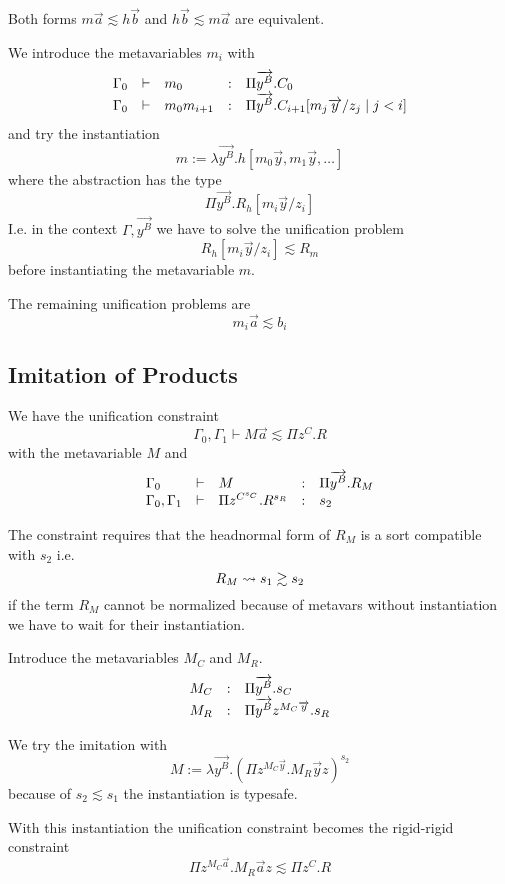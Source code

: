 Both forms $m \vec a \lesssim h \vec b$ and $h \vec b \lesssim m \vec a$ are
equivalent.

We introduce the metavariables $m_i$ with
$$
\begin{array}{lllll} 
    \Gamma_0 &\vdash&
    m_0
    &:&
    \Pi {\overrightarrow {y^B}}. C_0
    \\
    \Gamma_0 &\vdash&
    m_0
    m_{i + 1}
    &:&
    \Pi {\overrightarrow {y^B}}. C_{i + 1}[m_j {\overrightarrow {y}} / z_j \mid j < i]
 \end{array}
$$
and try the instantiation
$$
    m := \lambda \vec{y^B}. h [m_0 \vec y, m_1 \vec y, \ldots]
$$
where the abstraction has the type
$$
    \Pi \vec{y^B}. R_h[m_i \vec y / z_i]
$$
I.e. in the context $\Gamma, \vec{y^B}$ we have to solve the unification problem
$$
    R_h[m_i \vec y / z_i] \lesssim R_m
$$
before instantiating the metavariable $m$.

The remaining unification problems are
$$
    m_i \vec a \lesssim b_i
$$








\subsection{Imitation of Products}

We have the unification constraint
$$
    \Gamma_0, \Gamma_1 \vdash M \vec a \lesssim \Pi z^C. R
$$
with the metavariable $M$ and
$$
\begin{array}{lllll} 
    \Gamma_0
    &\vdash&
    M
    &:&
    \Pi {\overrightarrow {y^B}}. R_M
    \\
    \Gamma_0, \Gamma_1
    &\vdash&
    \Pi z^{C^{s_C}}. R^{s_R}
    &:&
    s_2
 \end{array}
$$

The constraint requires that the headnormal form of $R_M$ is a sort compatible
with $s_2$ i.e.
$$
    R_M \leadsto s_1 \gtrsim s_2
$$
if the term $R_M$ cannot be normalized because of metavars without instantiation
we have to wait for their instantiation.


Introduce the metavariables $M_C$ and $M_R$.
$$
\begin{array}{lllll} 
    M_C
    &:&
    \Pi {\overrightarrow {y^B}}. s_C
    \\
    M_R
    &:&
    \Pi {\overrightarrow {y^B}} z^{M_C {\overrightarrow {y}}}. s_R
 \end{array}
$$

We try the imitation with
$$
    M := \lambda \vec {y^B}. (\Pi z^{M_C \vec y}. M_R \vec y z)^{s_2}
$$
because of $s_2 \lesssim s_1$ the instantiation is typesafe.

With this instantiation the unification constraint becomes the rigid-rigid
constraint
$$
    \Pi z^{M_C \vec a}. M_R \vec a z
    \lesssim
    \Pi z^C. R
$$







